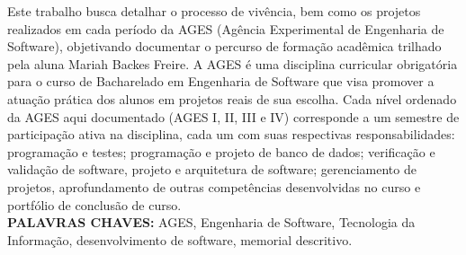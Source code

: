 \begin{resumo}
  Este trabalho busca detalhar o processo de vivência, bem como os projetos realizados em cada período da AGES (Agência Experimental de Engenharia de Software), objetivando documentar o percurso de formação acadêmica trilhado pela aluna Mariah Backes Freire. A AGES é uma disciplina curricular obrigatória para o curso de Bacharelado em Engenharia de Software que visa promover a atuação prática dos alunos em projetos reais de sua escolha. Cada nível ordenado da AGES aqui documentado (AGES I, II, III e IV) corresponde a um semestre de participação ativa na disciplina, cada um com suas respectivas responsabilidades: programação e testes; programação e projeto de banco de dados; verificação e validação de software, projeto e arquitetura de software; gerenciamento de projetos, aprofundamento de outras competências desenvolvidas no curso e portfólio de conclusão de curso.
  \bigbreak\
  \\\textbf{PALAVRAS CHAVES:}
  AGES, Engenharia de Software, Tecnologia da Informação, desenvolvimento de software, memorial descritivo.
\end{resumo}